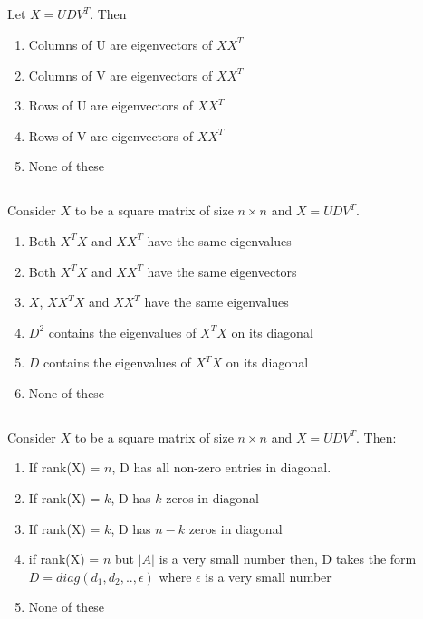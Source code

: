 \begin{frame}
\section{}
Let $X=UDV^T$. Then
\begin{enumerate}
\item Columns of U are eigenvectors of $XX^T$   %
\item Columns of V are eigenvectors of $XX^T$
\item Rows of U are eigenvectors of $XX^T$
\item Rows of V are eigenvectors of $XX^T$
\item None of these
\end{enumerate}
\end{frame}

\begin{frame}
\section{}
Consider $X$ to be a square matrix of size $n\times n$ and $X=UDV^T$.
\begin{enumerate}
\item Both $X^TX$ and $XX^T$ have the same eigenvalues    %
\item Both $X^TX$ and $XX^T$ have the same eigenvectors
\item $X$, $XX^TX$ and $XX^T$ have the same eigenvalues
\item $D^2$ contains the eigenvalues of $X^TX$ on its diagonal    %
\item $D$ contains the eigenvalues of $X^TX$ on its diagonal
\item None of these
\end{enumerate}
\end{frame}

\begin{frame}
\section{}
Consider $X$ to be a square matrix of size $n\times n$ and $X=UDV^T$.
Then:
\begin{enumerate}
\item If rank(X) = $n$, D has all non-zero entries in diagonal.   %
\item If rank(X) = $k$, D has $k$ zeros in diagonal
\item If rank(X) = $k$, D has $n-k$ zeros in diagonal   %
\item if rank(X) = $n$ but $\vert A \vert $ is a very small number then, D takes the form $D=diag(d_1,d_2,..,\epsilon)$ where $\epsilon$ is a very small number   %
\item None of these
\end{enumerate}
\end{frame}


